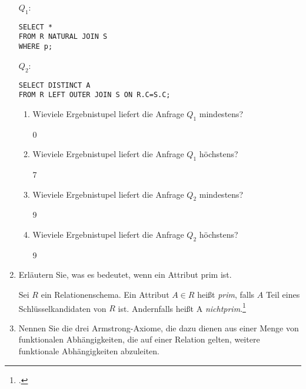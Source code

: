 \documentclass{lehramt-informatik-aufgabe}
\begin{document}
\begin{enumerate}
$Q_1$:

\begin{verbatim}
SELECT *
FROM R NATURAL JOIN S
WHERE p;
\end{verbatim}

$Q_2$:

\begin{verbatim}
SELECT DISTINCT A
FROM R LEFT OUTER JOIN S ON R.C=S.C;
\end{verbatim}

\begin{enumerate}
\item Wieviele Ergebnistupel liefert die Anfrage $Q_1$ mindestens?

\begin{liAntwort}
0
\end{liAntwort}

\item Wieviele Ergebnistupel liefert die Anfrage $Q_1$ höchstens?

\begin{liAntwort}
7
\end{liAntwort}

\item Wieviele Ergebnistupel liefert die Anfrage $Q_2$ mindestens?

\begin{liAntwort}
9
\end{liAntwort}

\item Wieviele Ergebnistupel liefert die Anfrage $Q_2$ höchstens?

\begin{liAntwort}
9
\end{liAntwort}
\end{enumerate}


\item Erläutern Sie, was es bedeutet, wenn ein Attribut prim ist.

\begin{liAntwort}
Sei $R$ ein Relationenschema. Ein Attribut $A \in R$ heißt \emph{prim},
falls $A$ Teil eines Schlüsselkandidaten von $R$ ist. Andernfalls heißt
A \emph{nichtprim}.\footcite[Seite 191]{winter}
\end{liAntwort}


\item Nennen Sie die drei Armstrong-Axiome, die dazu dienen aus einer
Menge von funktionalen Abhängigkeiten, die auf einer Relation gelten,
weitere funktionale Abhängigkeiten abzuleiten.


\end{enumerate}
\end{document}
